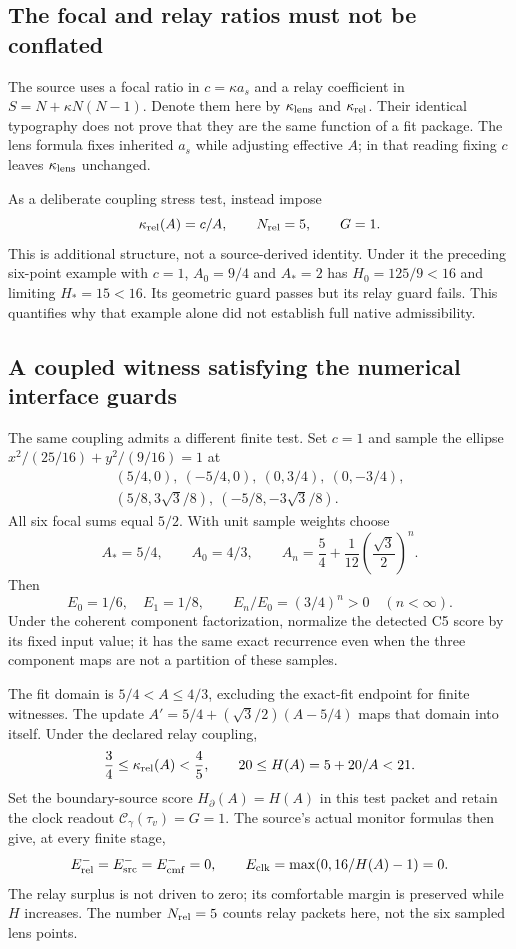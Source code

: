 \documentclass[11pt,a4paper]{article}
\begin{document}
\subsection{The focal and relay ratios must not be conflated}
The source uses a focal ratio in $c=\kappa a_s$ and a relay coefficient
in $S=N+\kappa N(N-1)$. Denote them here by
$\kappa_{\rm lens}$ and $\kappa_{\rm rel}$. Their identical typography
does not prove that they are the same function of a fit package.
The lens formula fixes inherited $a_s$ while adjusting effective $A$;
in that reading fixing $c$ leaves $\kappa_{\rm lens}$ unchanged.

As a deliberate coupling stress test, instead impose
\[
 \kappa_{\rm rel}(A)=c/A,\qquad N_{\rm rel}=5,\qquad G=1.
\]
This is additional structure, not a source-derived identity. Under it
the preceding six-point example with $c=1$, $A_0=9/4$ and $A_*=2$
has $H_0=125/9<16$ and limiting $H_*=15<16$.
Its geometric guard passes but its relay guard fails. This quantifies
why that example alone did not establish full native admissibility.

\subsection{A coupled witness satisfying the numerical interface guards}
The same coupling admits a different finite test. Set $c=1$ and sample
the ellipse $x^2/(25/16)+y^2/(9/16)=1$ at
\[
 \begin{gathered}
 (5/4,0),\ (-5/4,0),\ (0,3/4),\ (0,-3/4),\\
 (5/8,3\sqrt3/8),\ (-5/8,-3\sqrt3/8).
 \end{gathered}
\]
All six focal sums equal $5/2$. With unit sample weights choose
\[
 A_*=5/4,\qquad A_0=4/3,\qquad
 A_n=\frac54+\frac1{12}\left(\frac{\sqrt3}{2}\right)^n.
\]
Then
\[
 E_0=1/6,\quad E_1=1/8,\qquad
 E_n/E_0=(3/4)^n>0\quad(n<\infty).
\]
Under the coherent component factorization, normalize the detected C5
score by its fixed input value; it has the same exact recurrence even
when the three component maps are not a partition of these samples.

The fit domain is $5/4<A\le4/3$, excluding the exact-fit endpoint for
finite witnesses. The update $A'=5/4+(\sqrt3/2)(A-5/4)$ maps that
domain into itself. Under the declared relay coupling,
\[
 \frac34\le\kappa_{\rm rel}(A)<\frac45,\qquad
 20\le H(A)=5+20/A<21.
\]
Set the boundary-source score $H_\partial(A)=H(A)$ in this test packet
and retain the clock readout $\mathcal C_\gamma(\tau_v)=G=1$.
The source's actual monitor formulas then give, at every finite stage,
\[
 E_{\rm rel}^{-}=E_{\rm src}^{-}=E_{\rm cmf}^{-}=0,
 \qquad E_{\rm clk}=\max(0,16/H(A)-1)=0.
\]
The relay surplus is not driven to zero; its comfortable margin is
preserved while $H$ increases. The number $N_{\rm rel}=5$ counts relay
packets here, not the six sampled lens points.
\end{document}
